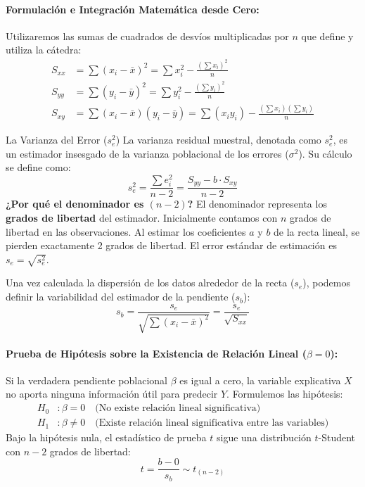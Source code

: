 \documentclass[11pt,letterpaper]{article}
\begin{document}
\paragraph{Formulación e Integración Matemática desde Cero:}
Utilizaremos las sumas de cuadrados de desvíos multiplicadas por $n$ que define y utiliza la cátedra:
\begin{align}
    S_{xx} &= \sum (x_i-\bar{x})^2 = \sum x_i^2 - \frac{(\sum x_i)^2}{n} \\
    S_{yy} &= \sum (y_i-\bar{y})^2 = \sum y_i^2 - \frac{(\sum y_i)^2}{n} \\
    S_{xy} &= \sum (x_i-\bar{x})(y_i-\bar{y}) = \sum (x_i y_i) - \frac{(\sum x_i)(\sum y_i)}{n}
\end{align}

\begin{importanteBox}{La Varianza del Error ($s_e^2$)}
La varianza residual muestral, denotada como $s_e^2$, es un estimador insesgado de la varianza poblacional de los errores ($\sigma^2$). Su cálculo se define como:
\begin{equation}
    s_e^2 = \frac{\sum e_i^2}{n-2} = \frac{S_{yy} - b \cdot S_{xy}}{n-2}
\end{equation}
\textbf{¿Por qué el denominador es $(n-2)$?} El denominador representa los \textbf{grados de libertad} del estimador. Inicialmente contamos con $n$ grados de libertad en las observaciones. Al estimar los coeficientes $a$ y $b$ de la recta lineal, se pierden exactamente 2 grados de libertad. El error estándar de estimación es $s_e = \sqrt{s_e^2}$.
\end{importanteBox}

Una vez calculada la dispersión de los datos alrededor de la recta ($s_e$), podemos definir la variabilidad del estimador de la pendiente ($s_b$):
\begin{equation}
    s_b = \frac{s_e}{\sqrt{\sum (x_i - \bar{x})^2}} = \frac{s_e}{\sqrt{S_{xx}}}
\end{equation}

\paragraph{Prueba de Hipótesis sobre la Existencia de Relación Lineal ($\beta = 0$):}
Si la verdadera pendiente poblacional $\beta$ es igual a cero, la variable explicativa $X$ no aporta ninguna información útil para predecir $Y$. Formulemos las hipótesis:
\begin{align*}
    H_0 &: \beta = 0 \quad \text{(No existe relación lineal significativa)} \\
    H_1 &: \beta \neq 0 \quad \text{(Existe relación lineal significativa entre las variables)}
\end{align*}
Bajo la hipótesis nula, el estadístico de prueba $t$ sigue una distribución $t$-Student con $n-2$ grados de libertad:
\begin{equation}
    t = \frac{b - 0}{s_b} \sim t_{(n-2)}
\end{equation}
\end{document}
